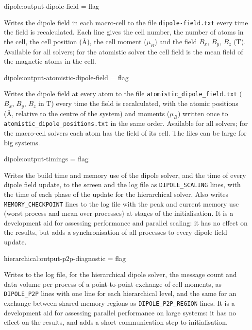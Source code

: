 {\zicf dipole:output-dipole-field = flag} Writes the dipole field in each macro-cell to the file \texttt{dipole-field.txt} every time the field is recalculated. Each line gives the cell number, the number of atoms in the cell, the cell position (\AA), the cell moment ($\mu_B$) and the field $B_x$, $B_y$, $B_z$ (T). Available for all solvers; for the atomistic solver the cell field is the mean field of the magnetic atoms in the cell.

{\zicf dipole:output-atomistic-dipole-field = flag} Writes the dipole field at every atom to the file \texttt{atomistic\_dipole\_field.txt} ($B_x$, $B_y$, $B_z$ in T) every time the field is recalculated, with the atomic positions (\AA, relative to the centre of the system) and moments ($\mu_B$) written once to \texttt{atomistic\_dipole\_positions.txt} in the same order. Available for all solvers; for the macro-cell solvers each atom has the field of its cell. The files can be large for big systems.

{\zicf dipole:output-timings = flag} Writes the build time and memory use of the dipole solver, and the time of every dipole field update, to the screen and the log file as \texttt{DIPOLE\_SCALING} lines, with the time of each phase of the update for the hierarchical solver. Also writes \texttt{MEMORY\_CHECKPOINT} lines to the log file with the peak and current memory use (worst process and mean over processes) at stages of the initialisation. It is a development aid for assessing performance and parallel scaling: it has no effect on the results, but adds a synchronisation of all processes to every dipole field update.

{\zicf hierarchical:output-p2p-diagnostic = flag} Writes to the log file, for the hierarchical dipole solver, the message count and data volume per process of a point-to-point exchange of cell moments, as \texttt{DIPOLE\_P2P} lines with one line for each hierarchical level, and the same for an exchange between shared memory regions as \texttt{DIPOLE\_P2P\_REGION} lines. It is a development aid for assessing parallel performance on large systems: it has no effect on the results, and adds a short communication step to initialisation.

